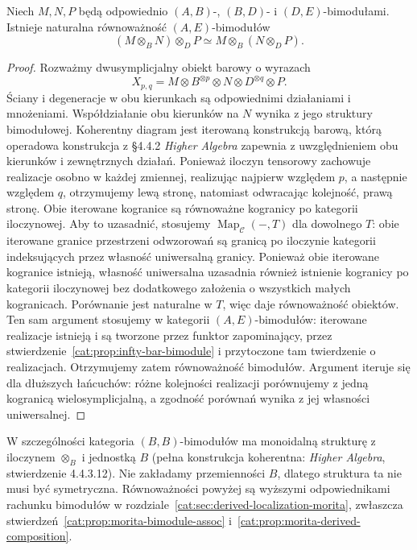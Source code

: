 \begin{twierdzenie}\label{cat:thm:infty-relative-tensor-assoc}
Niech $M,N,P$ będą odpowiednio $(A,B)$-, $(B,D)$- i $(D,E)$-bimodułami. Istnieje naturalna równoważność $(A,E)$-bimodułów
\[
 (M\otimes_B N)\otimes_D P
 \simeq M\otimes_B(N\otimes_D P).
\]
\end{twierdzenie}
\begin{proof}
Rozważmy dwusymplicjalny obiekt barowy o wyrazach
\[
 X_{p,q}=M\otimes B^{\otimes p}\otimes N
              \otimes D^{\otimes q}\otimes P.
\]
Ściany i degeneracje w obu kierunkach są odpowiednimi działaniami i mnożeniami. Współdziałanie obu kierunków na $N$ wynika z jego struktury bimodułowej. Koherentny diagram jest iterowaną konstrukcją barową, którą operadowa konstrukcja z \S4.4.2 \emph{Higher Algebra} zapewnia z uwzględnieniem obu kierunków i zewnętrznych działań. Ponieważ iloczyn tensorowy zachowuje realizacje osobno w każdej zmiennej, realizując najpierw względem $p$, a następnie względem $q$, otrzymujemy lewą stronę, natomiast odwracając kolejność, prawą stronę. Obie iterowane kogranice są równoważne kogranicy po kategorii iloczynowej. Aby to uzasadnić, stosujemy $\operatorname{Map}_{\mathcal C}(-,T)$ dla dowolnego $T$: obie iterowane granice przestrzeni odwzorowań są granicą po iloczynie kategorii indeksujących przez własność uniwersalną granicy. Ponieważ obie iterowane kogranice istnieją, własność uniwersalna uzasadnia również istnienie kogranicy po kategorii iloczynowej bez dodatkowego założenia o wszystkich małych kogranicach. Porównanie jest naturalne w $T$, więc daje równoważność obiektów. Ten sam argument stosujemy w kategorii $(A,E)$-bimodułów: iterowane realizacje istnieją i są tworzone przez funktor zapominający, przez stwierdzenie~\ref{cat:prop:infty-bar-bimodule} i przytoczone tam twierdzenie o realizacjach. Otrzymujemy zatem równoważność bimodułów. Argument iteruje się dla dłuższych łańcuchów: różne kolejności realizacji porównujemy z jedną kogranicą wielosymplicjalną, a zgodność porównań wynika z jej własności uniwersalnej.
\end{proof}

W szczególności kategoria $(B,B)$-bimodułów ma monoidalną strukturę z iloczynem $\otimes_B$ i jednostką $B$ (pełna konstrukcja koherentna: \emph{Higher Algebra}, stwierdzenie 4.4.3.12). Nie zakładamy przemienności $B$, dlatego struktura ta nie musi być symetryczna. Równoważności powyżej są wyższymi odpowiednikami rachunku bimodułów w rozdziale~\ref{cat:sec:derived-localization-morita}, zwłaszcza stwierdzeń~\ref{cat:prop:morita-bimodule-assoc} i~\ref{cat:prop:morita-derived-composition}.

